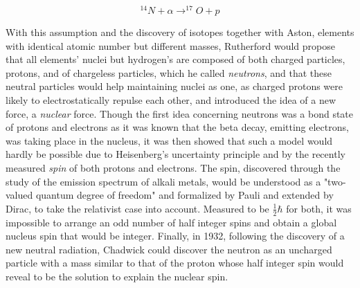 	\begin{equation}
		\label{eq:nuclear}
		^{14}N + \alpha \rightarrow ^{17}O + p
	\end{equation}
	
	With this assumption and the discovery of isotopes together with Aston, elements with identical atomic number but different masses, Rutherford would propose that all elements' nuclei but hydrogen's are composed of both charged particles, protons, and of chargeless particles, which he called \textit{neutrons}, and that these neutral particles would help maintaining nuclei as one, as charged protons were likely to electrostatically repulse each other, and introduced the idea of a new force, a \textit{nuclear} force. Though the first idea concerning neutrons was a bond state of protons and electrons as it was known that the beta decay, emitting electrons, was taking place in the nucleus, it was then showed that such a model would hardly be possible due to Heisenberg's uncertainty principle and by the recently measured \textit{spin} of both protons and electrons. The spin, discovered through the study of the emission spectrum of alkali metals, would be understood as a "two-valued quantum degree of freedom" and formalized by Pauli and extended by Dirac, to take the relativist case into account. Measured to be $\frac{1}{2} \hbar$ for both, it was impossible to arrange an odd number of half integer spins and obtain a global nucleus spin that would be integer. Finally, in 1932, following the discovery of a new neutral radiation, Chadwick could discover the neutron as an uncharged particle with a mass similar to that of the proton whose half integer spin would reveal to be the solution to explain the nuclear spin.
	
